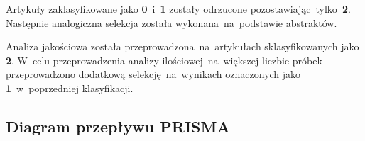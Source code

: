 Artykuły zaklasyfikowane jako {\bf0}~i~{\bf1} zostały odrzucone pozostawiając~tylko~{\bf2}. Następnie analogiczna selekcja została wykonana~na~podstawie abstraktów.

Analiza jakościowa została przeprowadzona~na~artykułach sklasyfikowanych jako \textbf{2}. W~celu przeprowadzenia analizy ilościowej~na~większej liczbie próbek przeprowadzono dodatkową selekcję~na~wynikach oznaczonych jako \textbf{1}~w~poprzedniej klasyfikacji.


\subsection{Diagram przepływu PRISMA}
\begin{figure}[H]
	\centering
	
	\label{fig:prisma_diagram}
\end{figure}
